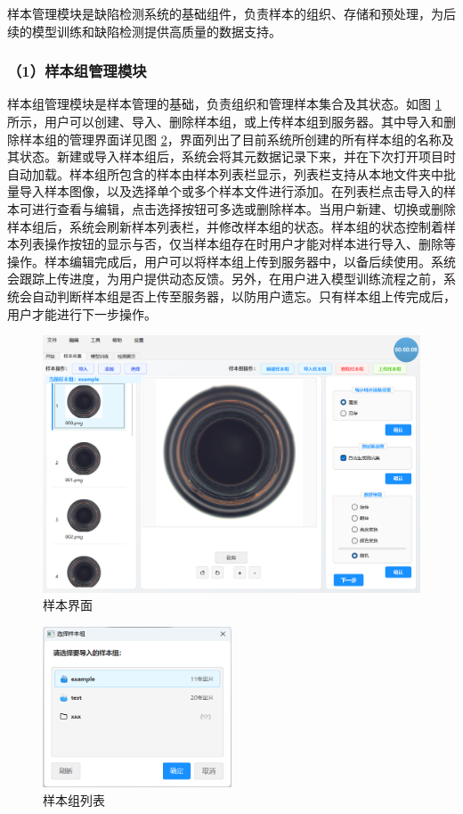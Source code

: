 \documentclass[
  ]{njuthesis}
\begin{document}
样本管理模块是缺陷检测系统的基础组件，负责样本的组织、存储和预处理，为后续的模型训练和缺陷检测提供高质量的数据支持。

\subsubsection{（1）样本组管理模块}

样本组管理模块是样本管理的基础，负责组织和管理样本集合及其状态。如图 \ref{样本界面} 所示，用户可以创建、导入、删除样本组，或上传样本组到服务器。其中导入和删除样本组的管理界面详见图 \ref{样本组列表}，界面列出了目前系统所创建的所有样本组的名称及其状态。新建或导入样本组后，系统会将其元数据记录下来，并在下次打开项目时自动加载。样本组所包含的样本由样本列表栏显示，列表栏支持从本地文件夹中批量导入样本图像，以及选择单个或多个样本文件进行添加。在列表栏点击导入的样本可进行查看与编辑，点击选择按钮可多选或删除样本。当用户新建、切换或删除样本组后，系统会刷新样本列表栏，并修改样本组的状态。样本组的状态控制着样本列表操作按钮的显示与否，仅当样本组存在时用户才能对样本进行导入、删除等操作。样本编辑完成后，用户可以将样本组上传到服务器中，以备后续使用。系统会跟踪上传进度，为用户提供动态反馈。另外，在用户进入模型训练流程之前，系统会自动判断样本组是否上传至服务器，以防用户遗忘。只有样本组上传完成后，用户才能进行下一步操作。

\begin{figure}[htb]
    \centering
    \includegraphics[width=\textwidth]{images/样本界面.png}
    \caption{样本界面}
    \label{样本界面}
\end{figure}

\begin{figure}[htb]
    \centering
    \includegraphics[width=0.5\textwidth]{images/样本组列表.png}
    \caption{样本组列表}
    \label{样本组列表}
\end{figure}
\end{document}
